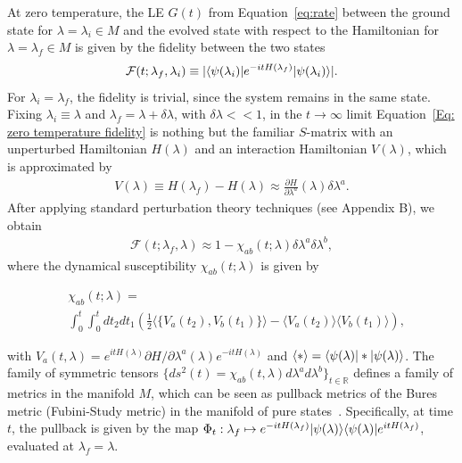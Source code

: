 At zero temperature, the LE $G(t)$ from Equation~\eqref{eq:rate} between the ground state for $\lambda=\lambda_i\in M$ and the evolved state with respect to the Hamiltonian for $\lambda=\lambda_f\in M$ is given by the fidelity between the two states
\begin{eqnarray}
\mathcal{F}(t;\lambda_{f},\lambda_i)\equiv |\langle \psi(\lambda_i) |e^{-it H(\lambda_f)}| \psi(\lambda_i) \rangle|.
\label{Eq: zero temperature fidelity}
\end{eqnarray}
For $\lambda_i=\lambda_f$, the fidelity is trivial, since the system remains in the same state. Fixing $\lambda_i\equiv \lambda$ and $\lambda_{f} = \lambda + \delta\lambda$, with $\delta\lambda<<1$, in the $t\rightarrow\infty$ limit Equation~\eqref{Eq: zero temperature fidelity} is nothing but the familiar $S$-matrix with an unperturbed Hamiltonian $H(\lambda)$ and an interaction Hamiltonian $V(\lambda)$, which is approximated by
\begin{eqnarray}
V(\lambda)\equiv H(\lambda_f)-H(\lambda)\approx\frac{\partial H}{\partial \lambda^{a}}(\lambda)\delta \lambda^a.
\label{Eq:2}
\end{eqnarray}
After applying standard perturbation theory techniques (see Appendix B),
 we obtain
\begin{eqnarray}
\mathcal{F}(t;\lambda_f,\lambda)\approx 1 -\chi_{ab}(t;\lambda)\delta \lambda^a \delta \lambda^b,
\end{eqnarray}
where the dynamical susceptibility $\chi_{ab}(t;\lambda)$ is given by
\begin{small}
\begin{eqnarray}
&\chi_{ab}(t;\lambda)=\nonumber \\
&\int_{0}^{t}\int_{0}^{t} dt_2dt_1 \left(\frac{1}{2}\langle \{V_{a}(t_2),V_{b}(t_1)\} \rangle-\langle V_{a}(t_2)\rangle \langle V_{b}(t_1) \rangle\right),
\label{Eq: zero temperature susceptibility}
\end{eqnarray}
\end{small}with $V_{a}(t,\lambda)=e^{it H(\lambda)}\partial H/\partial \lambda^{a}(\lambda)e^{-it H(\lambda)}$ and $\langle \ast\rangle=\langle \psi(\lambda) |\ast| \psi(\lambda) \rangle$. The family of symmetric tensors $\{ds^2(t)=\chi_{ab}(t,\lambda)d\lambda^a d\lambda^b\}_{t\in \mathbb{R}}$ defines a family of metrics in the manifold $M$, which can be seen as pullback metrics of the Bures metric (Fubini-Study metric) in the manifold of pure states~\cite{chr:jam:12}. Specifically, at time $t$, the pullback is given by the map $\Phi_t: \lambda_f \mapsto e^{-it H(\lambda_f)}| \psi(\lambda) \rangle\langle \psi(\lambda) |e^{i t H(\lambda_f)}$, evaluated at $\lambda_f=\lambda$.
 
